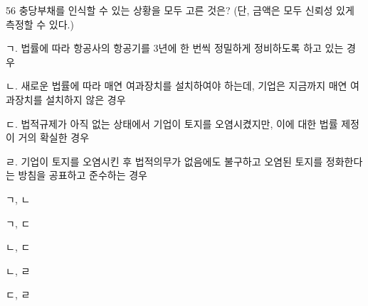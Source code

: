 \begin{question}{56}
충당부채를 인식할 수 있는 상황을 모두 고른 것은? (단, 금액은 모두 신뢰성 있게 측정할 수 있다.)
\begin{framedtext}
ㄱ. 법률에 따라 항공사의 항공기를 3년에 한 번씩 정밀하게 정비하도록 하고 있는 경우 \par
ㄴ. 새로운 법률에 따라 매연 여과장치를 설치하여야 하는데, 기업은 지금까지 매연 여과장치를 설치하지 않은 경우 \par
ㄷ. 법적규제가 아직 없는 상태에서 기업이 토지를 오염시켰지만, 이에 대한 법률 제정이 거의 확실한 경우 \par
ㄹ. 기업이 토지를 오염시킨 후 법적의무가 없음에도 불구하고 오염된 토지를 정화한다는 방침을 공표하고 준수하는 경우
\end{framedtext}
\begin{choices}
  \item ㄱ, ㄴ
  \item ㄱ, ㄷ
  \item ㄴ, ㄷ
  \item ㄴ, ㄹ
  \item ㄷ, ㄹ
\end{choices}
\end{question}
